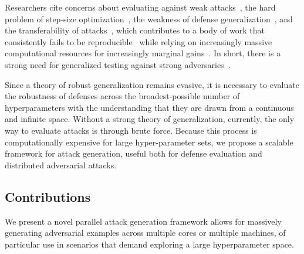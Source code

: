 \documentclass[fonts]{icst}
\begin{document}
Researchers cite concerns about evaluating against weak attacks~\cite{uesato2018adversarial,carlini2019evaluating}, the hard problem of step-size optimization~\cite{li2016general}, the weakness of defense generalization~\cite{stutz2019confidence}, and the transferability of attacks~\cite{demontis2019adversarial}, which contributes to a body of work that consistently fails to be reproducible~\cite{croce2020reliable} while  relying on increasingly massive computational resources for increasingly marginal gains~\cite{desislavov2021compute}.
In short, there is a strong need for generalized testing against strong adversaries~\cite{carlini2019evaluating}.

Since a theory of robust generalization remains evasive, it is necessary to evaluate the robustness of defenses across the broadest-possible number of hyperparameters with the understanding that they are drawn from a continuous and infinite space.
Without a strong theory of generalization, currently, the only way to evaluate attacks is through brute force.
Because this process is computationally expensive for large hyper-parameter sets, we propose a scalable framework for attack generation, useful both for defense evaluation and distributed adversarial attacks.


\subsection{Contributions}


We present a novel parallel attack generation framework allows for massively generating adversarial examples across multiple cores or multiple machines, of particular use in scenarios that demand exploring a large hyperparameter space.
\end{document}
